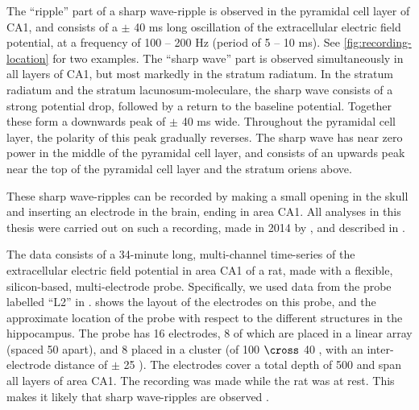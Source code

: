 The ``ripple'' part of a sharp wave-ripple is observed in the pyramidal cell layer of CA1, and consists of a $\pm$ 40 ms long oscillation of the extracellular electric field potential, at a frequency of 100 -- 200 Hz (period of 5 -- 10 ms). See \cref{fig:recording-location} for two examples. The ``sharp wave'' part is observed simultaneously in all layers of CA1, but most markedly in the stratum radiatum. In the stratum radiatum and the stratum lacunosum-moleculare, the sharp wave consists of a strong potential drop, followed by a return to the baseline potential. Together these form a downwards peak of $\pm$ 40 ms wide. Throughout the pyramidal cell layer, the polarity of this peak gradually reverses. The sharp wave has near zero power in the middle of the pyramidal cell layer, and consists of an upwards peak near the top of the pyramidal cell layer and the stratum oriens above.




These sharp wave-ripples can be recorded by making a small opening in the skull and inserting an electrode in the brain, ending in area CA1. All analyses in this thesis were carried out on such a recording, made in 2014 by \citeauthor*{Michon2016}, and described in .

The data consists of a 34-minute long, multi-channel time-series of the extracellular electric field potential in area CA1 of a rat, made with a flexible, silicon-based, multi-electrode probe. Specifically, we used data from the probe labelled ``L2'' in \cite{Michon2016}.  shows the layout of the electrodes on this probe, and the approximate location of the probe with respect to the different structures in the hippocampus. The probe has 16 electrodes, 8 of which are placed in a linear array (spaced 50 \um{} apart), and 8 placed in a cluster (of 100 \um{} $\cross$ 40 \um{}, with an inter-electrode distance of $\pm$ 25 \um{}). The electrodes cover a total depth of 500 \um{} and span all layers of area CA1.
The recording was made while the rat was at rest. This makes it likely that  sharp wave-ripples are observed \cite{Buzsaki2015}. 




